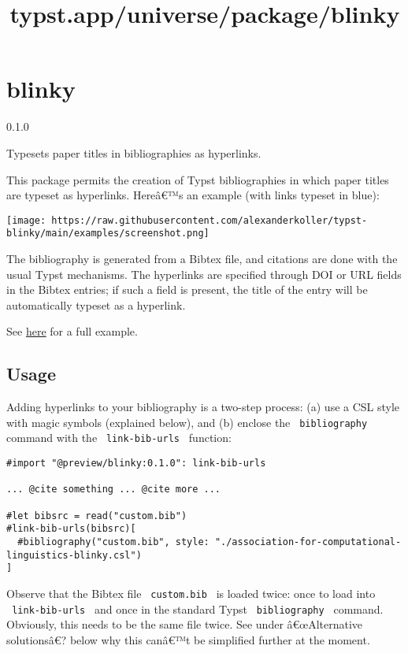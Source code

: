 \title{typst.app/universe/package/blinky}

\label{banner}
\section{blinky}\label{blinky}

{ 0.1.0 }

Typesets paper titles in bibliographies as hyperlinks.

\label{readme}
This package permits the creation of Typst bibliographies in which paper
titles are typeset as hyperlinks. Hereâ€™s an example (with links
typeset in blue):

\texttt{[image: https://raw.githubusercontent.com/alexanderkoller/typst-blinky/main/examples/screenshot.png]}

The bibliography is generated from a Bibtex file, and citations are done
with the usual Typst mechanisms. The hyperlinks are specified through
DOI or URL fields in the Bibtex entries; if such a field is present, the
title of the entry will be automatically typeset as a hyperlink.

See
\href{https://github.com/alexanderkoller/typst-blinky/tree/main/examples}{here}
for a full example.

\subsection{Usage}\label{usage}

Adding hyperlinks to your bibliography is a two-step process: (a) use a
CSL style with magic symbols (explained below), and (b) enclose the
\texttt{\ bibliography\ } command with the \texttt{\ link-bib-urls\ }
function:

\begin{verbatim}
#import "@preview/blinky:0.1.0": link-bib-urls

... @cite something ... @cite more ...

#let bibsrc = read("custom.bib")
#link-bib-urls(bibsrc)[
  #bibliography("custom.bib", style: "./association-for-computational-linguistics-blinky.csl")
]
\end{verbatim}

Observe that the Bibtex file \texttt{\ custom.bib\ } is loaded twice:
once to load into \texttt{\ link-bib-urls\ } and once in the standard
Typst \texttt{\ bibliography\ } command. Obviously, this needs to be the
same file twice. See under â€œAlternative solutionsâ€? below why this
canâ€™t be simplified further at the moment.

